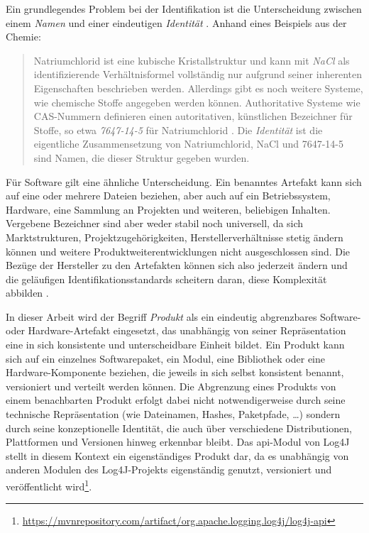 Ein grundlegendes Problem bei der Identifikation ist die Unterscheidung zwischen einem \textit{Namen} und einer eindeutigen \textit{Identität} \autocite{Manion_Proell_Schmidt2023}.
Anhand eines Beispiels aus der Chemie:

\begin{quote}
    Natriumchlorid ist eine kubische Kristallstruktur und kann mit \textit{NaCl} als identifizierende Verhältnisformel vollständig nur aufgrund seiner inherenten Eigenschaften beschrieben werden.
    Allerdings gibt es noch weitere Systeme, wie chemische Stoffe angegeben werden können.
    Authoritative Systeme wie CAS-Nummern definieren einen autoritativen, künstlichen Bezeichner für Stoffe, so etwa \textit{7647-14-5} für Natriumchlorid \autocite{Huebner_2003}.
    Die \textit{Identität} ist die eigentliche Zusammensetzung von Natriumchlorid, NaCl und 7647-14-5 sind Namen, die dieser Struktur gegeben wurden.
\end{quote}

Für Software gilt eine ähnliche Unterscheidung.
Ein benanntes Artefakt kann sich auf eine oder mehrere Dateien beziehen, aber auch auf ein Betriebssystem, Hardware, eine Sammlung an Projekten und weiteren, beliebigen Inhalten.
Vergebene Bezeichner sind aber weder stabil noch universell, da sich Marktstrukturen, Projektzugehörigkeiten, Herstellerverhältnisse stetig ändern können und weitere Produktweiterentwicklungen nicht ausgeschlossen sind.
Die Bezüge der Hersteller zu den Artefakten können sich also jederzeit ändern und die geläufigen Identifikationsstandards scheitern daran, diese Komplexität abbilden \autocite{Manion_Proell_Schmidt2023}.

In dieser Arbeit wird der Begriff \textit{Produkt} als ein eindeutig abgrenzbares Software- oder Hardware-Artefakt eingesetzt, das unabhängig von seiner Repräsentation eine in sich konsistente und unterscheidbare Einheit bildet.
Ein Produkt kann sich auf ein einzelnes Softwarepaket, ein Modul, eine Bibliothek oder eine Hardware-Komponente beziehen, die jeweils in sich selbst konsistent benannt, versioniert und verteilt werden können.
Die Abgrenzung eines Produkts von einem benachbarten Produkt erfolgt dabei nicht notwendigerweise durch seine technische Repräsentation (wie Dateinamen, Hashes, Paketpfade, \ldots) sondern durch seine konzeptionelle Identität, die auch über verschiedene Distributionen, Plattformen und Versionen hinweg erkennbar bleibt.
Das \acrshort{api}-Modul von Log4J stellt in diesem Kontext ein eigenständiges Produkt dar, da es unabhängig von anderen Modulen des Log4J-Projekts eigenständig genutzt, versioniert und veröffentlicht wird\footnote{\url{https://mvnrepository.com/artifact/org.apache.logging.log4j/log4j-api}}.


